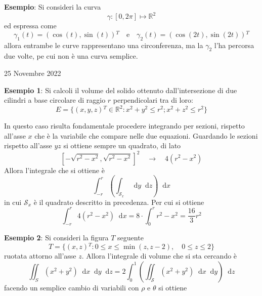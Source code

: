 \documentclass[a4paper]{extarticle}
\newcommand*\dif{\mathop{}\!\mathrm{d}}
\begin{document}
\vspace{2em}
\noindent
\textbf{Esempio}: Si consideri la curva
\[\gamma : [0,2\pi] \longmapsto \mathbb{R}^2\]
ed espressa come
\[\gamma_1(t) = (\cos(t),\sin(t)){^T} \hspace{1em} \text{e} \hspace{1em} \gamma_2(t) = (\cos(2t), \sin(2t)){^T}\]
allora entrambe le curve rappresentano una circonferenza, ma la $\gamma_2$ l'ha percorsa due volte, pe cui non è una curva semplice.

\newpage
\noindent
\begin{center}
    25 Novembre 2022
\end{center}
\vspace{1em}
\textbf{Esempio 1}: Si calcoli il volume del solido ottenuto dall'intersezione di due cilindri a base circolare di raggio $r$ perpendicolari tra di loro:
\[E=\{(x,y,z){^T} \in \mathbb{R}^2 : x^2+y^2 \leq r^2 ;x^2+z^2 \leq r^2\}\]

\vspace{2em}
\noindent
In questo caso risulta fondamentale procedere integrando per sezioni, rispetto all'asse $x$ che è la variabile che compare nelle due equazioni. Guardando le sezioni rispetto all'asse $yz$ si ottiene sempre un quadrato, di lato 
\[\left[-\sqrt{r^2-x^2},\sqrt{r^2-x^2}\right]^2 \hspace{1em} \rightarrow \hspace{1em} 4 (r^2-x^2)\]
Allora l'integrale che si ottiene è
\[\int_{-r}^{r} \left(\int_{\mathcal{S}_x} \dif y \dif z\right) \dif x\]
in cui $\mathcal{S}_x$ è il quadrato descritto in precedenza. Per cui si ottiene
\[\int_{-r}^r 4 (r^2-x^2) \dif x = 8 \cdot \int_0^r r^2-x^2 = \dfrac{16}{3}r^2 \]

\vspace{2em}
\noindent
\textbf{Esempio 2}: Si consideri la figura $T$ seguente
\[T = \{(x,z){^T} : 0 \leq x \leq \min(z,z-2), \hspace{1em} 0 \leq z \leq 2\}\]
ruotata attorno all'asse $z$. Allora l'integrale di volume che si sta cercando è
\[\iint_S \left(x^2+y^2\right) \dif x \dif y \dif z = 2 \int_0^1 \left(\iint_\mathcal{S} (x^2+y^2) \dif x \dif y\right) \dif z\]
facendo un semplice cambio di variabili con $\rho$ e $\theta$ si ottiene
\end{document}
